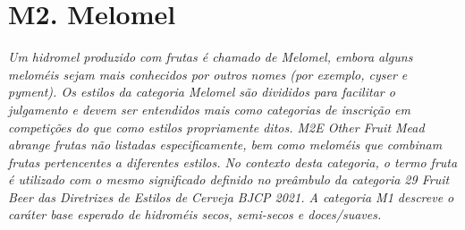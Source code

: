 \section*{M2. Melomel}
\textit{Um hidromel produzido com frutas é chamado de Melomel, embora alguns meloméis sejam mais conhecidos por outros nomes (por exemplo, cyser e pyment). Os estilos da categoria Melomel são divididos para facilitar o julgamento e devem ser entendidos mais como categorias de inscrição em competições do que como estilos propriamente ditos. M2E Other Fruit Mead abrange frutas não listadas especificamente, bem como meloméis que combinam frutas pertencentes a diferentes estilos. No contexto desta categoria, o termo fruta é utilizado com o mesmo significado definido no preâmbulo da categoria 29 Fruit Beer das Diretrizes de Estilos de Cerveja BJCP 2021. A categoria M1 descreve o caráter base esperado de hidroméis secos, semi-secos e doces/suaves.}